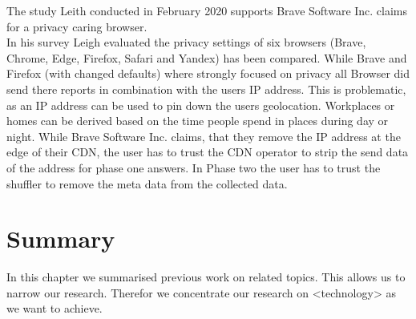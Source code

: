     The study Leith conducted in February 2020 \cite{leith_web_2020} supports Brave Software Inc. claims
    for a privacy caring browser.\\
    In his survey Leigh evaluated the privacy settings of six browsers (Brave, Chrome, Edge, Firefox, Safari and Yandex) has been compared. While Brave and Firefox (with changed defaults) where strongly focused on privacy all Browser did send there reports in combination with the users IP address\cite{leith_web_2020}.
    This is problematic, as an IP address can be used to pin down the users geolocation\cite{koch_geolocation_2013}. Workplaces or homes can be derived based on the time people spend in places during day or night. 
    While Brave Software Inc. claims, that they remove the IP address at the edge of their CDN, the user has to trust the CDN operator to strip the send data of the address for phase one answers. In Phase two the user has to trust the shuffler to remove the meta data from the collected data. 

\section{Summary}
In this chapter we summarised previous work on related topics. This allows us to narrow our research.
Therefor we concentrate our research on <technology> as we want to achieve.
%


  